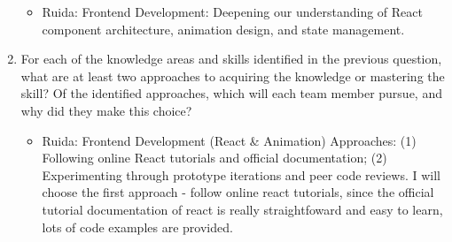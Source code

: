 \begin{enumerate}
\begin{itemize}
\item Ruida: Frontend Development: Deepening our understanding of React component architecture, animation design, and state management.
\end{itemize}
  \item For each of the knowledge areas and skills identified in the previous
  question, what are at least two approaches to acquiring the knowledge or
  mastering the skill?  Of the identified approaches, which will each team
  member pursue, and why did they make this choice?
	\begin{itemize}
	\item Ruida: Frontend Development (React \& Animation)
	Approaches: (1) Following online React tutorials and official documentation; (2) Experimenting through prototype 	iterations and peer code reviews. I will choose the first approach - follow online react tutorials,  since the official tutorial documentation of react is really straightfoward and easy to learn, lots of code examples are provided.
	\end{itemize}
\end{enumerate}
